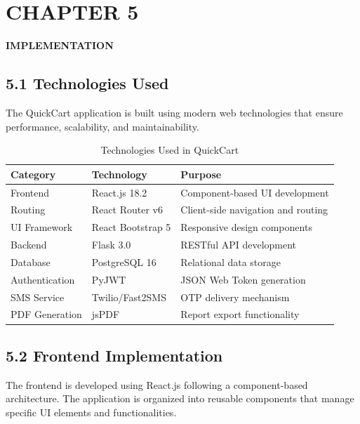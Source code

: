 \documentclass[12pt,a4paper]{report}
\begin{document}
\chapter*{CHAPTER 5}

\begin{center}
    \textbf{\large IMPLEMENTATION}
\end{center}

\section*{5.1 Technologies Used}

The QuickCart application is built using modern web technologies that ensure performance, scalability, and maintainability.

\begin{table}[h]
\centering
\small
\begin{tabular}{|p{3cm}|p{3.5cm}|p{6.5cm}|}
\hline
\textbf{Category} & \textbf{Technology} & \textbf{Purpose} \\
\hline
Frontend & React.js 18.2 & Component-based UI development \\
\hline
Routing & React Router v6 & Client-side navigation and routing \\
\hline
UI Framework & React Bootstrap 5 & Responsive design components \\
\hline
Backend & Flask 3.0 & RESTful API development \\
\hline
Database & PostgreSQL 16 & Relational data storage \\
\hline
Authentication & PyJWT & JSON Web Token generation \\
\hline
SMS Service & Twilio/Fast2SMS & OTP delivery mechanism \\
\hline
PDF Generation & jsPDF & Report export functionality \\
\hline
\end{tabular}
\caption{Technologies Used in QuickCart}
\end{table}

\section*{5.2 Frontend Implementation}

The frontend is developed using React.js following a component-based architecture. The application is organized into reusable components that manage specific UI elements and functionalities.
\end{document}
